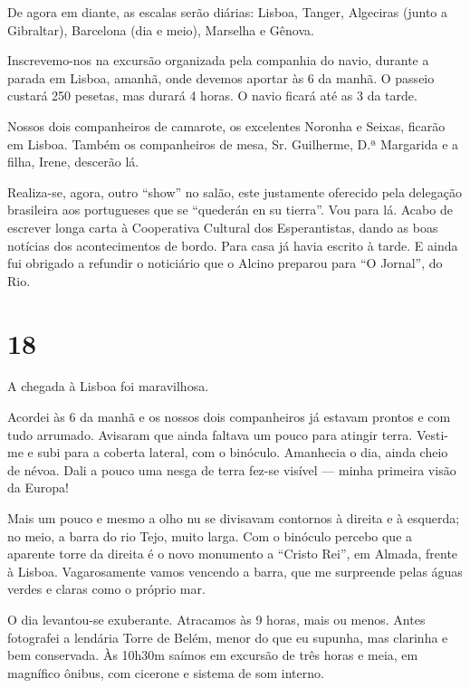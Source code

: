 De agora em diante, as escalas serão diárias: Lisboa, Tanger, Algeciras (junto a Gibraltar), Barcelona (dia e meio), Marselha e Gênova.

Inscrevemo-nos na excursão organizada pela companhia do navio, durante a parada em Lisboa, amanhã, onde devemos aportar às 6 da manhã. O passeio custará 250 pesetas, mas durará 4 horas. O navio ficará até as 3 da tarde.

Nossos dois companheiros de camarote, os excelentes Noronha e Seixas, ficarão em Lisboa. Também os companheiros de mesa, Sr. Guilherme, D.ª Margarida e a filha, Irene, descerão lá.

Realiza-se, agora, outro ``show'' no salão, este justamente oferecido pela delegação brasileira aos portugueses que se ``quederán en su tierra''. Vou para lá. Acabo de escrever longa carta à Cooperativa Cultural dos Esperantistas, dando as boas notícias dos acontecimentos de bordo. Para casa já havia escrito à tarde. E ainda fui obrigado a refundir o noticiário que o Alcino preparou para ``O Jornal'', do Rio.

\section*{18 \adfflatleafright {}}

A chegada à Lisboa foi maravilhosa.

Acordei às 6 da manhã e os nossos dois companheiros já estavam prontos e com tudo arrumado. Avisaram que ainda faltava um pouco para atingir terra. Vesti-me e subi para a coberta lateral, com o binóculo. Amanhecia o dia, ainda cheio de névoa. Dali a pouco uma nesga de terra fez-se visível --- minha primeira visão da Europa!

Mais um pouco e mesmo a olho nu se divisavam contornos à direita e à esquerda; no meio, a barra do rio Tejo, muito larga. Com o binóculo percebo que a aparente torre da direita é o novo monumento a ``Cristo Rei'', em Almada, frente à Lisboa. Vagarosamente vamos vencendo a barra, que me surpreende pelas águas verdes e claras como o próprio mar.

O dia levantou-se exuberante. Atracamos às 9 horas, mais ou menos. Antes fotografei a lendária Torre de Belém, menor do que eu supunha, mas clarinha e bem conservada. Às 10h30m saímos em excursão de três horas e meia, em magnífico ônibus, com cicerone e sistema de som interno.


